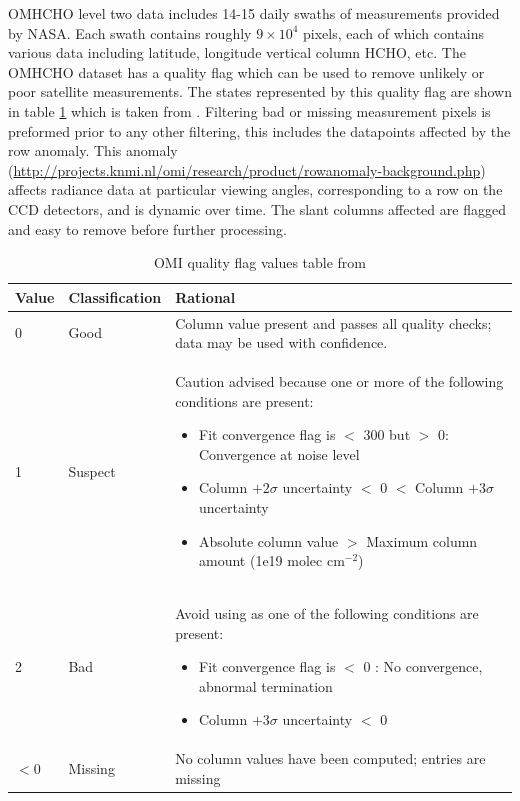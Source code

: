       
      OMHCHO level two data includes 14-15 daily swaths of measurements provided by NASA.
      Each swath contains roughly $9 \times 10^4$ pixels, each of which contains various data including latitude, longitude vertical column HCHO, etc.
      The OMHCHO dataset has a quality flag which can be used to remove unlikely or poor satellite measurements.
      The states represented by this quality flag are shown in table \ref{Model:Datasets:OMHCHO:tab_qflag} which is taken from \citet{Kurosu2014}.
      Filtering bad or missing measurement pixels is preformed prior to any other filtering, this includes the datapoints affected by the row anomaly.
      This anomaly (\url{http://projects.knmi.nl/omi/research/product/rowanomaly-background.php}) affects radiance data at particular viewing angles, corresponding to a row on the CCD detectors, and is dynamic over time.
      The slant columns affected are flagged and easy to remove before further processing.
      
      \begin{table}
        \caption{OMI quality flag values table from \citet{Kurosu2014}}
        \begin{tabular}{  l  l  p{10cm} }
          \hline
          \textbf{Value} & \textbf{Classification} & \textbf{Rational} 
          \\ \hline
          0 & Good & Column value present and passes all quality checks; data may be used with confidence. 
          \\ \hline
          1 & Suspect & Caution advised because one or more of the following conditions are present: 
          \begin{itemize}
            \item Fit convergence flag is $<$ 300 but $>$ 0: Convergence at noise level
            \item Column $+ 2 \sigma$ uncertainty $<$ 0 $<$ Column $ + 3 \sigma $ uncertainty
            \item Absolute column value $>$ Maximum column amount (1e19 molec cm$^{-2}$)
          \end{itemize}
          \\ \hline
          2 & Bad & Avoid using as one of the following conditions are present: 
          \begin{itemize}
            \item Fit convergence flag is $<$ 0 : No convergence, abnormal termination
            \item Column $+ 3 \sigma$ uncertainty $<$ 0
          \end{itemize}
          \\ \hline
          $<0$ & Missing & No column values have been computed; entries are missing
          \\ \hline
        \end{tabular}
        \label{Model:Datasets:OMHCHO:tab_qflag}
      \end{table}
      
